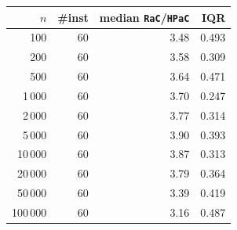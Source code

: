 \begin{tabular}{@{}rrrr@{}}
\toprule
$n$ & \#inst & median \texttt{RaC}/\texttt{HPaC} & IQR \\
\midrule
100 & 60 & 3.48 & 0.493 \\
200 & 60 & 3.58 & 0.309 \\
500 & 60 & 3.64 & 0.471 \\
1\,000 & 60 & 3.70 & 0.247 \\
2\,000 & 60 & 3.77 & 0.314 \\
5\,000 & 60 & 3.90 & 0.393 \\
10\,000 & 60 & 3.87 & 0.313 \\
20\,000 & 60 & 3.79 & 0.364 \\
50\,000 & 60 & 3.39 & 0.419 \\
100\,000 & 60 & 3.16 & 0.487 \\
\bottomrule
\end{tabular}
